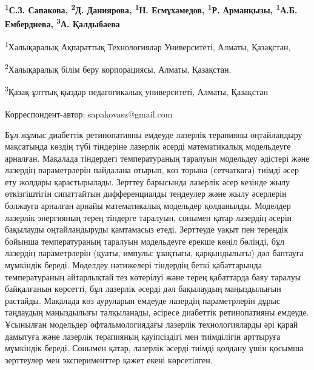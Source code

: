 
\begin{articleheader}

{\bfseries
\textsuperscript{1}С.З. Сапакова\textsuperscript{\envelope },
\textsuperscript{2}Д. Даниярова,
\textsuperscript{1}Н. Есмұхамедов,
\textsuperscript{1}Р. Арманқызы,
\textsuperscript{1}А.Б. Ембердиева,
\textsuperscript{3}А. Қалдыбаева
}
\end{articleheader}

\begin{affiliation}
\textsuperscript{1}Халықаралық Ақпараттық Технологиялар Университеті, Алматы, Қазақстан,

\textsuperscript{2}Халықаралық білім беру корпорациясы, Алматы, Қазақстан,

\textsuperscript{3}Қазақ ұлттық қыздар педагогикалық университеті, Алматы, Қазақстан

\raggedright \textsuperscript{\envelope }Корреспондент-автор: sapakovasz@gmail.com
\end{affiliation}

Бұл жұмыс диабеттік ретинопатияны емдеуде лазерлік терапияны
оңтайландыру мақсатында көздің түбі тіндеріне лазерлік әсерді
математикалық модельдеуге арналған. Мақалада тіндердегі температураның
таралуын модельдеу әдістері және лазердің параметрлерін пайдалана
отырып, көз торына (сетчаткаға) тиімді әсер ету жолдары қарастырылады.
Зерттеу барысында лазерлік әсер кезінде жылу өткізгіштігін сипаттайтын
дифференциалды теңдеулер және жылу әсерлерін болжауға арналған арнайы
математикалық модельдер қолданылды. Моделдер лазерлік энергияның терең
тіндерге таралуын, сонымен қатар лазердің әсерін бақылауды
оңтайландыруды қамтамасыз етеді. Зерттеуде уақыт пен тереңдік бойынша
температураның таралуын модельдеуге ерекше көңіл бөлінді, бұл лазердің
параметрлерін (қуаты, импульс ұзақтығы, қарқындылығы) дәл баптауға
мүмкіндік береді. Моделдеу нәтижелері тіндердің беткі қабаттарында
температураның айтарлықтай тез көтерілуі және терең қабаттарда баяу
таралуы байқалғанын көрсетті, бұл лазерлік әсерді дәл бақылаудың
маңыздылығын растайды. Мақалада көз ауруларын емдеуде лазердің
параметрлерін дұрыс таңдаудың маңыздылығы талқыланады, әсіресе диабеттік
ретинопатияны емдеуде. Ұсынылған модельдер офтальмологиядағы лазерлік
технологияларды әрі қарай дамытуға және лазерлік терапияның қауіпсіздігі
мен тиімділігін арттыруға мүмкіндік береді. Сонымен қатар, лазерлік
әсерді тиімді қолдану үшін қосымша зерттеулер мен эксперименттер қажет
екені көрсетілген.

